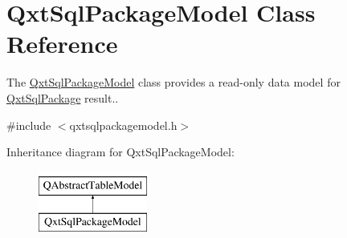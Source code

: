 \hypertarget{class_qxt_sql_package_model}{\section{Qxt\-Sql\-Package\-Model Class Reference}
\label{class_qxt_sql_package_model}
}


The \hyperlink{class_qxt_sql_package_model}{Qxt\-Sql\-Package\-Model} class provides a read-\/only data model for \hyperlink{class_qxt_sql_package}{Qxt\-Sql\-Package} result..  




{\ttfamily \#include $<$qxtsqlpackagemodel.\-h$>$}

Inheritance diagram for Qxt\-Sql\-Package\-Model\-:\begin{figure}[H]
\begin{center}
\leavevmode
\includegraphics[height=2.000000cm]{class_qxt_sql_package_model}
\end{center}
\end{figure}
